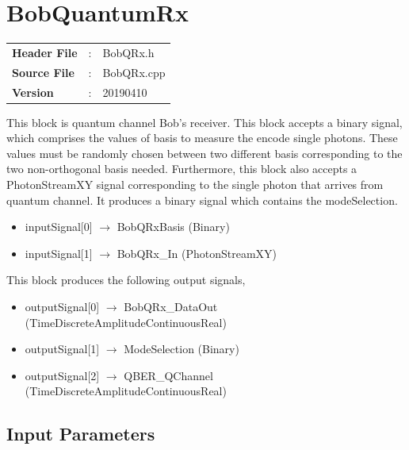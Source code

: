 \clearpage

\section{BobQuantumRx}

\begin{tcolorbox}	
\begin{tabular}{p{2.75cm} p{0.2cm} p{10.5cm}} 	
\textbf{Header File}   &:& BobQRx.h \\
\textbf{Source File}   &:& BobQRx.cpp \\
\textbf{Version}       &:& 20190410
\end{tabular}
\end{tcolorbox}

\maketitle
This block is quantum channel Bob's receiver. This block accepts a binary signal, which comprises the values of basis to measure the encode single photons. These values must be randomly chosen between two different basis corresponding to the two non-orthogonal basis needed. Furthermore, this block also accepts a PhotonStreamXY signal corresponding to the single photon that arrives from quantum channel. It produces a binary signal which contains the modeSelection.

\begin{itemize}
  \item inputSignal[0] $\rightarrow$ BobQRxBasis (Binary)
  \item inputSignal[1] $\rightarrow$ BobQRx\_In (PhotonStreamXY)
\end{itemize}

This block produces the following output signals,

\begin{itemize}
  \item outputSignal[0] $\rightarrow$ BobQRx\_DataOut (TimeDiscreteAmplitudeContinuousReal)
  \item outputSignal[1] $\rightarrow$ ModeSelection (Binary)
  \item outputSignal[2] $\rightarrow$ QBER\_QChannel (TimeDiscreteAmplitudeContinuousReal)
\end{itemize}


\subsection*{Input Parameters}

